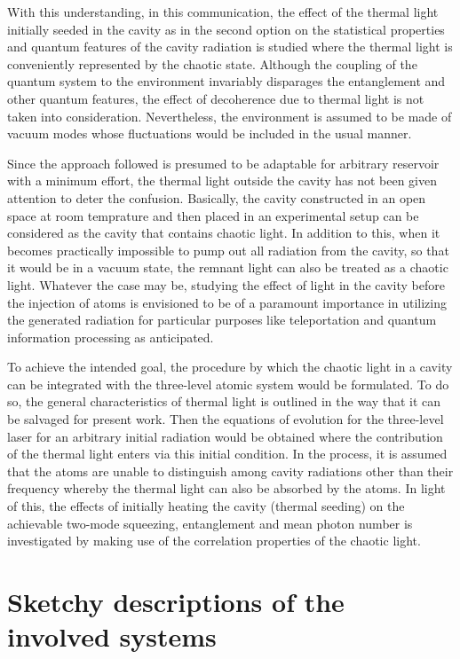 \documentclass[twocolumn,showpacs,preprintnumbers,amsmath,amssymb,pra]{revtex4}
\begin{document}
With this understanding, in this communication, the effect of the thermal light initially seeded in the cavity as in the second option on the statistical properties and quantum features of the cavity radiation is studied where the thermal light is conveniently represented by the chaotic state. Although the coupling of the quantum system to the environment invariably disparages the entanglement and other quantum features, the effect of decoherence due to thermal light is not taken into consideration. Nevertheless, the environment is assumed to be made of vacuum modes whose fluctuations would be included in the usual manner. 

Since the approach followed is presumed to be adaptable for arbitrary reservoir with a minimum effort, the thermal light outside the cavity has not been given attention to deter the confusion. Basically, the cavity constructed in an open space at room temprature and then placed in an experimental setup can be considered as the cavity that contains chaotic light. In addition to this, when it becomes practically impossible to pump out all radiation from the cavity, so that it would be in a vacuum state, the remnant light can also be treated as a chaotic light. Whatever the case may be, studying the effect of light in the cavity before the injection of atoms is envisioned to be of a paramount importance in utilizing the generated radiation for particular purposes like teleportation and quantum information processing as anticipated. 

To achieve the intended goal, the procedure by which the chaotic light in a cavity can be integrated with the three-level atomic system would be formulated. To do so, the general characteristics of thermal light is outlined in the way that it can be salvaged for present work. Then the equations of evolution for the three-level laser for an arbitrary initial radiation would be obtained where the contribution of the thermal light enters via this initial condition. In the process, it is assumed that the atoms are unable to distinguish among cavity radiations other than their frequency whereby the thermal light can also be absorbed by the atoms. In light of this, the effects of initially heating the cavity (thermal seeding) on the achievable two-mode squeezing, entanglement and mean photon number is investigated by making use of the correlation properties of the chaotic light. 

\section{Sketchy descriptions of the involved systems}
\end{document}
